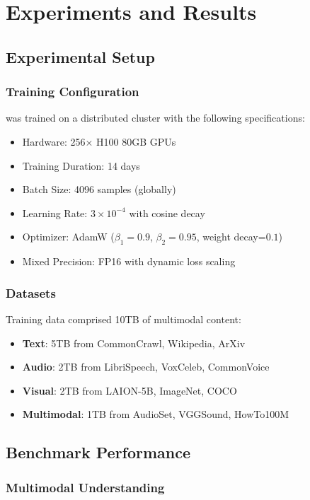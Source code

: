 \section{Experiments and Results}
\label{sec:experiments}

\subsection{Experimental Setup}

\subsubsection{Training Configuration}
\zen{} was trained on a distributed cluster with the following specifications:
\begin{itemize}
    \item Hardware: 256× H100 80GB GPUs
    \item Training Duration: 14 days
    \item Batch Size: 4096 samples (globally)
    \item Learning Rate: $3 \times 10^{-4}$ with cosine decay
    \item Optimizer: AdamW ($\beta_1=0.9$, $\beta_2=0.95$, weight decay=$0.1$)
    \item Mixed Precision: FP16 with dynamic loss scaling
\end{itemize}

\subsubsection{Datasets}
Training data comprised 10TB of multimodal content:
\begin{itemize}
    \item \textbf{Text}: 5TB from CommonCrawl, Wikipedia, ArXiv
    \item \textbf{Audio}: 2TB from LibriSpeech, VoxCeleb, CommonVoice
    \item \textbf{Visual}: 2TB from LAION-5B, ImageNet, COCO
    \item \textbf{Multimodal}: 1TB from AudioSet, VGGSound, HowTo100M
\end{itemize}

\subsection{Benchmark Performance}

\subsubsection{Multimodal Understanding}

